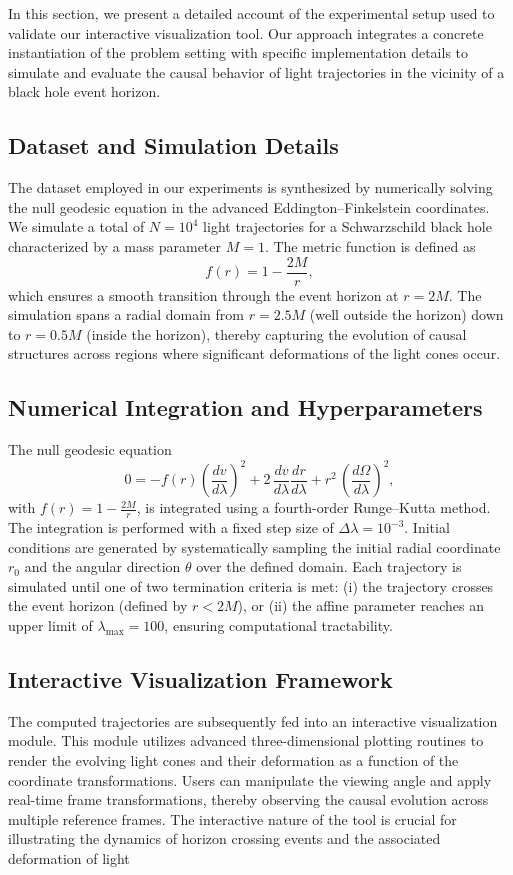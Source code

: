 \documentclass{article}
\begin{document}
In this section, we present a detailed account of the experimental setup used to validate our interactive visualization tool. Our approach integrates a concrete instantiation of the problem setting with specific implementation details to simulate and evaluate the causal behavior of light trajectories in the vicinity of a black hole event horizon.\subsection{Dataset and Simulation Details}The dataset employed in our experiments is synthesized by numerically solving the null geodesic equation in the advanced Eddington--Finkelstein coordinates. We simulate a total of $N=10^4$ light trajectories for a Schwarzschild black hole characterized by a mass parameter $M=1$. The metric function is defined as\begin{equation}f(r)=1-\frac{2M}{r},\end{equation}which ensures a smooth transition through the event horizon at $r=2M$. The simulation spans a radial domain from $r=2.5M$ (well outside the horizon) down to $r=0.5M$ (inside the horizon), thereby capturing the evolution of causal structures across regions where significant deformations of the light cones occur.\subsection{Numerical Integration and Hyperparameters}The null geodesic equation\begin{equation}0 = -f(r)\left(\frac{dv}{d\lambda}\right)^2 + 2\,\frac{dv}{d\lambda}\frac{dr}{d\lambda} + r^2\,\left(\frac{d\Omega}{d\lambda}\right)^2,\end{equation}with $f(r)=1-\frac{2M}{r}$, is integrated using a fourth-order Runge--Kutta method. The integration is performed with a fixed step size of $\Delta \lambda=10^{-3}$. Initial conditions are generated by systematically sampling the initial radial coordinate $r_0$ and the angular direction $\theta$ over the defined domain. Each trajectory is simulated until one of two termination criteria is met: (i) the trajectory crosses the event horizon (defined by $r<2M$), or (ii) the affine parameter reaches an upper limit of $\lambda_{\max}=100$, ensuring computational tractability.\subsection{Interactive Visualization Framework}The computed trajectories are subsequently fed into an interactive visualization module. This module utilizes advanced three-dimensional plotting routines to render the evolving light cones and their deformation as a function of the coordinate transformations. Users can manipulate the viewing angle and apply real-time frame transformations, thereby observing the causal evolution across multiple reference frames. The interactive nature of the tool is crucial for illustrating the dynamics of horizon crossing events and the associated deformation of light 
\end{document}
